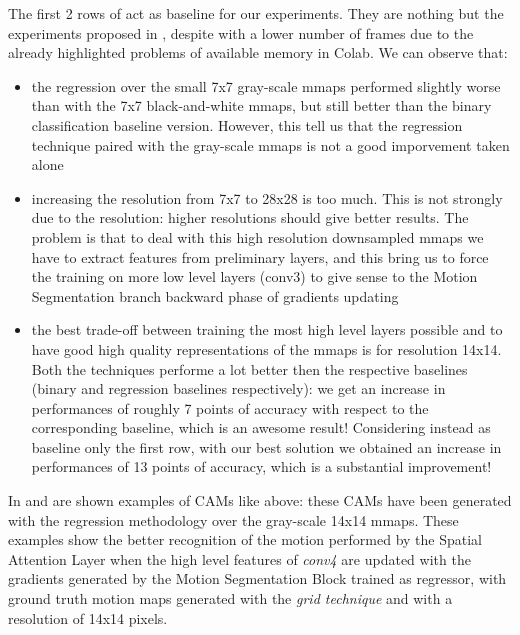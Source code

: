 \documentclass[10pt,twocolumn,hidelinks,letterpaper]{article}
\begin{document}
The first 2 rows of  act as baseline for our experiments. They are nothing but the experiments proposed in \cite{sparnet}, despite with a lower number of frames due to the already highlighted problems of available memory in Colab. We can observe that:
\begin{itemize}
  \item the regression over the small 7x7 gray-scale mmaps performed slightly worse than with the 7x7 black-and-white mmaps, but still better than the binary classification baseline version. However, this tell us that the regression technique paired with the gray-scale mmaps is not a good imporvement taken alone
  \item increasing the resolution from 7x7 to 28x28 is too much. This is not strongly due to the resolution: higher resolutions should give better results. The problem is that to deal with this high resolution downsampled mmaps we have to extract features from preliminary layers, and this bring us to force the training on more low level layers (conv3) to give sense to the Motion Segmentation branch backward phase of gradients updating
  \item the best trade-off between training the most high level layers possible and to have good high quality representations of the mmaps is for resolution 14x14. Both the techniques performe a lot better then the respective baselines (binary and regression baselines respectively): we get an increase in performances of roughly 7 points of accuracy with respect to the corresponding baseline, which is an awesome result! Considering instead as baseline only the first row, with our best solution we obtained an increase in performances of 13 points of accuracy, which is a substantial improvement!
\end{itemize}

In  and  are shown examples of CAMs like above: these CAMs have been generated with the regression methodology over the gray-scale 14x14 mmaps. These examples show the better recognition of the motion performed by the Spatial Attention Layer when the high level features of \textit{conv4} are updated with the gradients generated by the Motion Segmentation Block trained as regressor, with ground truth motion maps generated with the \textit{grid technique} and with a resolution of 14x14 pixels.
\end{document}
